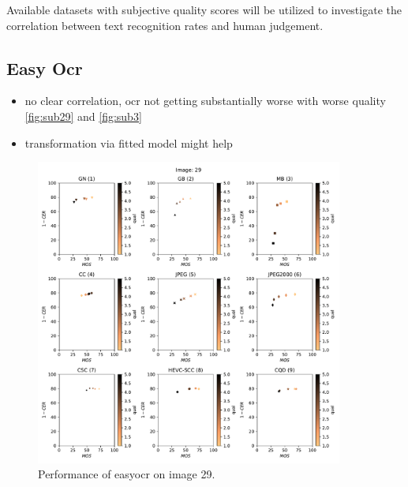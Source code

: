 Available datasets with subjective quality scores will be utilized to investigate
the correlation between text recognition rates and human judgement.

\subsection{Easy Ocr}
\label{subsec:easy_ocr}

\begin{itemize}
\item no clear correlation, ocr not getting substantially worse with worse quality \autoref{fig:sub29} and \autoref{fig:sub3}
\item transformation via fitted model might help
\end{itemize}

\begin{figure}[h]
\centering
\includegraphics[width=0.9\textwidth]{../../images/analyze/mos_ter_ezocr_sub_img29.pdf}
\caption{Performance of easyocr on image 29.}
\label{fig:sub29}
\end{figure}

